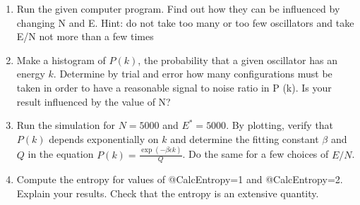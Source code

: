 \documentclass[10pt]{article}
\begin{document}
\begin{enumerate}
  \item Run the given computer program. Find out how they can be influenced by changing N and E. Hint: do not take too many or too few oscillators and take E/N not more than a few times
  \item Make a histogram of $P(k)$, the probability that a given oscillator has an energy $k$. Determine by trial and error how many configurations must be taken in order to have a reasonable signal to noise
ratio in P (k). Is your result influenced by the value of N?
  \item Run the simulation for $N=5000$ and $E^* = 5000$. By plotting, verify that $P(k)$ depends exponentially on $k$ and determine  the fitting constant $\beta$ and $Q$ in the equation $P(k) = \frac{\exp(-\beta\epsilon k)}{Q}$. Do the same for a few choices of $E/N$.

\item Compute the entropy for values of @CalcEntropy=1 and @CalcEntropy=2. Explain your results. Check that the entropy is an extensive quantity.

\end{enumerate}





\end{document}
